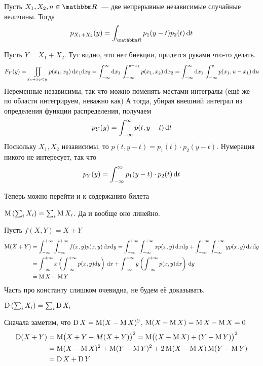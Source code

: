 \documentclass[12pt,timbord]{../../../notes}
\begin{document}
\begin{prop}\label{prop:stat::randsum::contsum}
  Пусть $X_1,X_2,n\in\R$~--- две непрерывные независимые случайные величины. Тогда 
  \[
    p_{X_1+X_2}(y) = \int_{\R} p_1(y-t) p_2(t) \,\del t
  \]
\end{prop}
\begin{itlproof}
  Пусть $Y = X_1 + X_2$. Тут видно, что нет биекции, придется руками что-то делать.
  \[
    F_Y(y) = \displaystyle\iint_{x_1+x_2 < y} p(x_1, x_2) \, \mathrm{d} x_1 \mathrm{d} x_2
    = \int_{-\infty}^\infty \mathrm{d} x_1\, \int_{-\infty}^{y-x_1} p(x_1, x_2) \, \mathrm{d} x_2 
    = \int_{-\infty}^\infty \mathrm{d} x_1 \, \int_{-\infty}^y p(x_1, u - x_1) \, \mathrm{d} u
  \]
  Переменные независимы, так что можно поменять местами интегралы (ещё же по области интегрируем,
  неважно как)
  А тогда, убирая внешний интеграл из определения функции распределения, получаем
  \[
    p_Y(y) = \int_{-\infty}^\infty p(t, y-t)\, \mathrm{d} t
  \]
  Поскольку $X_1, X_2$ независимы, то $p(t, y-t) = p_1(t)\cdot p_2(y-t)$. Нумерация никого не
  интересует, так что
  \[
    p_Y(y) =  \int_{-\infty}^\infty p_1(y-t)\cdot p_2(t)\, \mathrm{d} t
  \]
\end{itlproof}

Теперь можно перейти и к содержанию билета
\begin{prop}\label{prop:stat::randsum::exp}
  $\operatorname{M} \left(\sum_i X_i\right) = \sum_i \operatorname{M} X_i $. Да и вообще оно линейно.
\end{prop}
\begin{itlproof}
  Пусть $f(X,Y)= X+Y$
  \[
    \begin{split}
      \operatorname{M} (X+Y) &= \int_{-\infty}^{+\infty}\int_{-\infty}^{+\infty} f(x,y) p(x,y)\, \mathrm{d} x\mathrm{d} y 
      = \int_{-\infty}^{+\infty}\int_{-\infty}^{+\infty} x p(x,y)\, \mathrm{d} x \mathrm{d} y + \int_{-\infty}^{+\infty}\int_{-\infty}^{+\infty} y p(x,y)\, \mathrm{d} x \mathrm{d} y \\
      &= \int_{-\infty}^{+\infty} x 
      \left(\int_{-\infty}^{+\infty} p(x,y) \mathrm{d} y\right)\, \mathrm{d} x + \int_{-\infty}^{+\infty} y \left(\int_{-\infty}^{+\infty} p(x,y) \mathrm{d} x\right)\,\mathrm{d} y \\
      &= \operatorname{M} X + \operatorname{M} Y
    \end{split}
  \]
    Часть про константу слишком очевидна, не будем её доказывать. 
\end{itlproof}

\begin{prop}\label{prop:stat::randsum::var}
  $\operatorname{D} \left(\sum_i X_i\right) = \sum_i \operatorname{D} X_i$
\end{prop}
\begin{itlproof}
  Сначала заметим, что $\operatorname{D} X = \operatorname{M} (X- \operatorname{M} X)^2$, $\operatorname{M} (X - \operatorname{M} X) = \operatorname{M} X - \operatorname{M} X = 0$
  \[
    \begin{split}
      \operatorname{D} (X+Y) &= \operatorname{M} \bigl(X+Y - M(X+Y)\bigr)^2 = \operatorname{M} \bigl((X-\operatorname{M} X) +(Y-\operatorname{M} Y) \bigr)^2 \\
                 &= \operatorname{M} (X-\operatorname{M} X)^2 + \operatorname{M} (Y-\operatorname{M} Y)^2 + 2 \operatorname{M} (X-\operatorname{M} X) \operatorname{M} (Y - \operatorname{M} Y)\\ 
                 &= \operatorname{D} X + \operatorname{D} Y
    \end{split}
  \]
\end{itlproof}
\end{document}
